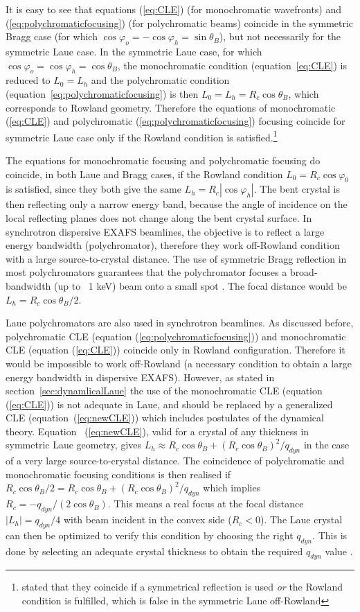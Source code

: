 \documentclass[preprint]{iucr}              %
\begin{document}
It is easy to see that equations (\ref{eq:CLE}) (for monochromatic wavefronts) and (\ref{eq:polychromaticfocusing}) (for polychromatic beams) coincide in the symmetric Bragg case (for which $\cos\varphi_o=-\cos\varphi_h=\sin\theta_B$), but not necessarily for the symmetric Laue case. In the symmetric Laue case, for which $\cos\varphi_o=\cos\varphi_h=\cos\theta_B$, the monochromatic condition (equation~\ref{eq:CLE}) is reduced to $L_0=L_h$ and the polychromatic condition (equation~\ref{eq:polychromaticfocusing}) is then $L_0=L_h=R_c\cos\theta_B$, which corresponds to Rowland geometry. Therefore the equations of monochromatic (\ref{eq:CLE}) and polychromatic (\ref{eq:polychromaticfocusing}) focusing coincide for symmetric Laue case only if the Rowland condition is satisfied.\footnote{\cite{CK} stated that they coincide if a symmetrical reflection is used {\it or} the Rowland condition is fulfilled, which is false in the symmetric Laue off-Rowland}

The equations for monochromatic focusing and polychromatic focusing do coincide, in both Laue and Bragg cases, if the Rowland condition $L_0=R_c\cos\varphi_0$ is satisfied, since they both give the same $L_h=R_c|\cos\varphi_h|$. The bent crystal is then reflecting only a narrow energy band, because the angle of incidence on the local reflecting planes does not change along the bent crystal surface.
In synchrotron dispersive EXAFS beamlines, the objective is to reflect a large energy bandwidth (polychromator), therefore they work off-Rowland condition with a large source-to-crystal distance. The use of symmetric Bragg reflection in most polychromators guarantees that the polychromator focuses a broad-bandwidth (up to ~1 keV) beam onto a small spot \cite{Tolentino:ms0206}. The focal distance would be $L_h=R_c\cos\theta_B/2$.

Laue polychromators are also used in synchrotron beamlines.
As discussed before,
polychromatic CLE (equation (\ref{eq:polychromaticfocusing})) and monochromatic CLE (equation (\ref{eq:CLE})) coincide only in Rowland configuration. Therefore it would be impossible to work off-Rowland  (a necessary condition to obtain a large energy bandwidth in dispersive EXAFS). However, as stated in section~\ref{sec:dynamlicalLaue} the use of the monochromatic CLE (equation (\ref{eq:CLE})) is not adequate in Laue, and should be replaced by a generalized CLE (equation~(\ref{eq:newCLE})) which includes postulates of the dynamical theory.
Equation ~(\ref{eq:newCLE}), valid for a crystal of any thickness in symmetric Laue geometry, gives $L_h \approx R_c \cos\theta_B + (R_c \cos\theta_B) ^2 / q_{dyn}$ in the case of a very large source-to-crystal distance. The coincidence of polychromatic and monochromatic focusing conditions is then realised if
$R_c \cos\theta_B /2 = R_c \cos\theta_B+ (R_c \cos\theta_B) ^2 / q_{dyn}$ which implies $R_c=-q_{dyn}/(2\cos\theta_B)$.
This means a real focus at the focal distance $|L_h|=q_{dyn}/4$ with beam incident in the convex side ($R_c<0$). The Laue crystal can then be optimized to verify this condition by choosing the right $q_{dyn}$. This is done by selecting an adequate crystal thickness to obtain the required $q_{dyn}$ value \cite{Mocella2004} \cite{Mocella2008}. 
\end{document}
